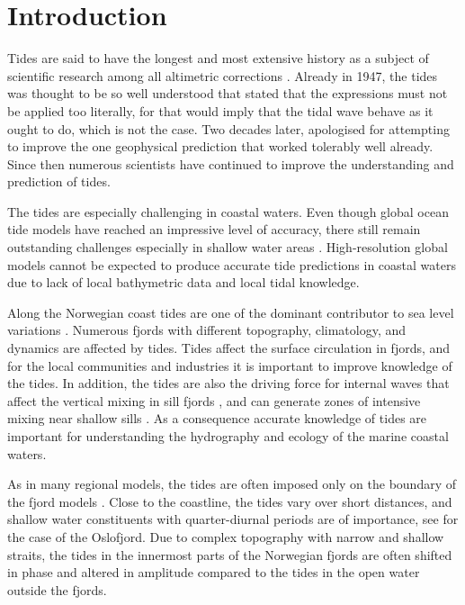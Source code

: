 \section{Introduction}

Tides are said to have the longest and most extensive history as a subject of scientific research among all altimetric corrections \cite[]{egbert94,cartwright77,hendershott81}. Already in 1947, the tides was thought to be so well understood that \cite{unna47} stated that the expressions must not be applied too literally, for that would imply that the tidal wave behave as it ought to do, which is not the case. Two decades later,  \cite{munk66} apologised for attempting to improve the one geophysical prediction that worked tolerably well already. Since then numerous scientists have continued to improve the understanding and prediction of tides. 

The tides are especially challenging in coastal waters. Even though global ocean tide models have reached an impressive level of accuracy, there still remain outstanding challenges especially in shallow water areas \cite[]{stammer14}. 
High-resolution global models cannot be expected to produce accurate tide predictions in coastal waters due to lack of local bathymetric data and local tidal knowledge. 

Along the Norwegian coast tides are one of the dominant contributor to sea level variations \cite[]{grabbe09}. Numerous fjords with different topography, climatology, and dynamics are affected by tides. Tides affect the surface circulation in fjords, and for the local communities and industries it is important to improve knowledge of the tides. In addition, the tides are also the driving force for internal waves that affect the vertical mixing in sill fjords \cite[]{stigebrandt76}, and can generate zones of intensive mixing near shallow sills \cite[]{staal15}. As a consequence accurate knowledge of tides are important for understanding the hydrography and ecology of the marine coastal waters.

As in many regional models, the tides are often imposed only on the boundary of the fjord models \cite[]{gjevik89,carniello05,lynge13}. Close to the coastline, the tides vary over short distances, and shallow water constituents with quarter-diurnal periods are of importance, see \cite{trygg74} for the case of the Oslofjord. Due to complex topography with narrow and shallow straits, 
the tides in the innermost parts of the Norwegian fjords are often shifted in phase and altered in amplitude compared to the tides in the open water outside the fjords. 

